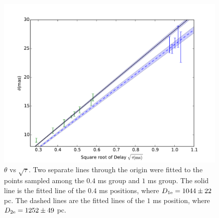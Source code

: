 \documentclass[useAMS,usenatbib]{mn2e}
\begin{document}
\begin{figure}
\centering
\includegraphics[width=1.0\linewidth, angle=0]{Theta_tau.pdf}
\caption{${\theta}$ vs ${\sqrt{\tau}}$. Two separate lines through the
  origin were fitted to the points sampled among the $0.4$ ms group
  and $1$ ms group. The solid line is the fitted line of the $0.4$ ms
  positions, where $D_{1\rm e}=1044\pm 22$ pc. The dashed lines are
  the fitted lines of the $1$ ms 
  position, where $D_{2\rm e}=1252\pm 49$ pc.
}
\label{thetatau}
\end{figure}
\end{document}
